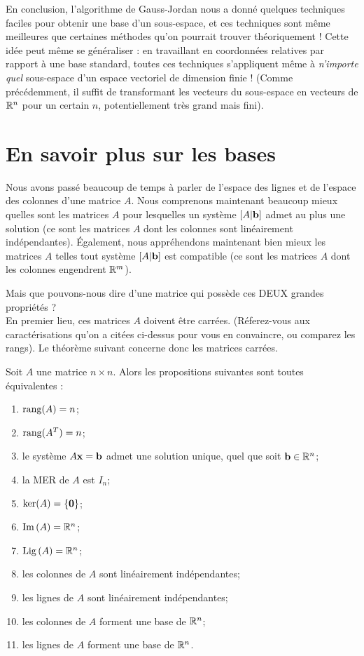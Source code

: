 En conclusion, l'algorithme de Gauss-Jordan nous a donné quelques techniques faciles
pour obtenir une base d'un sous-espace, et ces techniques sont même  meilleures que certaines méthodes qu'on pourrait trouver théoriquement !  Cette idée peut même se généraliser :
en travaillant en coordonnées relatives par rapport à une base standard, 
toutes ces techniques s'appliquent même à \emph{n'importe quel} sous-espace d'un espace vectoriel
de dimension finie ! (Comme précédemment, il suffit de transformant les vecteurs du sous-espace en vecteurs de $\mathbb{R}^n$ pour un certain $n$, potentiellement très grand mais fini).


\section{En savoir plus sur les bases}
Nous avons passé beaucoup de temps à parler de l'espace des lignes et de l'espace des colonnes
d'une matrice $A$. Nous comprenons maintenant beaucoup mieux quelles sont les matrices $A$ pour lesquelles un système $[A|\mathbf{b}]$ admet au plus une solution (ce sont les matrices $A$ dont les colonnes sont linéairement indépendantes).
Également, nous appréhendons maintenant bien mieux 
les matrices $A$ telles tout système $[A|\mathbf{b}]$ est compatible
(ce sont les matrices $A$ dont les colonnes engendrent $\mathbb{R}^m$).  

Mais que pouvons-nous dire
d'une matrice qui possède ces DEUX grandes propriétés ?\\

En premier lieu, ces matrices $A$ doivent être carrées.  (R\'eferez-vous aux
caractérisations qu'on a citées ci-dessus pour vous en convaincre, ou comparez les rangs).  
Le théorème suivant concerne donc les matrices carrées.

\begin{theorem}\label{thm:inv_charact}
Soit $A$ une matrice $n\times n$. 
Alors les propositions suivantes sont toutes équivalentes :
\begin{enumerate}[(1)]
\item $\textrm{rang}(A) = n$;
\item $\textrm{rang}(A^T) = n$;
\item le syst\`eme $A\mathbf{x}=\mathbf{b}$ admet une solution unique, quel que soit $\mathbf{b}\in\mathbb{R}^n$;
\item la MER de $A$ est $I_n$;
\item $\ker(A) = \{\mathbf{0}\}$;
\item $\operatorname{Im}\,(A) = \mathbb{R}^n$;
\item $\operatorname{Lig\,}(A) = \mathbb{R}^n$;
\item les colonnes de $A$ sont linéairement indépendantes;
\item les lignes de $A$ sont linéairement indépendantes;
\item les colonnes de $A$ forment une base de $\mathbb{R}^n$;
\item les lignes de $A$ forment une base de $\mathbb{R}^n$.
\end{enumerate}
\end{theorem}

